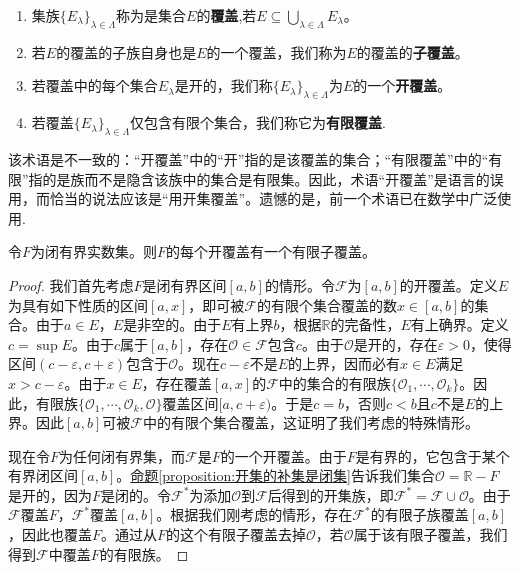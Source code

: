 \documentclass[lang=cn,newtx,10pt,scheme=chinese]{elegantbook}
\begin{document}
\begin{definition}[覆盖]\label{definition:覆盖}
\begin{enumerate}
  \item 集族\(\{E_{\lambda}\}_{\lambda\in\Lambda}\)称为是集合\(E\)的\textbf{覆盖},若\(E\subseteq\bigcup_{\lambda\in\Lambda}E_{\lambda}\)。
  
  \item 若\(E\)的覆盖的子族自身也是\(E\)的一个覆盖，我们称为\(E\)的覆盖的\textbf{子覆盖}。
  
  \item 若覆盖中的每个集合\(E_{\lambda}\)是开的，我们称\(\{E_{\lambda}\}_{\lambda\in\Lambda}\)为\(E\)的一个\textbf{开覆盖}。
  
  \item 若覆盖\(\{E_{\lambda}\}_{\lambda\in\Lambda}\)仅包含有限个集合，我们称它为\textbf{有限覆盖}.
\end{enumerate} 
\end{definition}
\begin{note}
  该术语是不一致的：“开覆盖”中的“开”指的是该覆盖的集合；“有限覆盖”中的“有限”指的是族而不是隐含该族中的集合是有限集。因此，术语“开覆盖”是语言的误用，而恰当的说法应该是“用开集覆盖”。遗憾的是，前一个术语已在数学中广泛使用.
\end{note}

\begin{theorem}\label{theorem:Heine - Borel定理}
  令\(F\)为闭有界实数集。则\(F\)的每个开覆盖有一个有限子覆盖。
\end{theorem}
\begin{proof}
  我们首先考虑\(F\)是闭有界区间\([a, b]\)的情形。令\(\mathcal{F}\)为\([a, b]\)的开覆盖。定义\(E\)为具有如下性质的区间\([a, x]\)，即可被\(\mathcal{F}\)的有限个集合覆盖的数\(x\in[a, b]\)的集合。由于\(a\in E\)，\(E\)是非空的。由于\(E\)有上界\(b\)，根据\(\mathbb{R}\)的完备性，\(E\)有上确界。定义\(c = \sup E\)。由于\(c\)属于\([a, b]\)，存在\(\mathcal{O}\in\mathcal{F}\)包含\(c\)。由于\(\mathcal{O}\)是开的，存在\(\varepsilon>0\)，使得区间\((c - \varepsilon, c+\varepsilon)\)包含于\(\mathcal{O}\)。现在\(c - \varepsilon\)不是\(E\)的上界，因而必有\(x\in E\)满足\(x>c - \varepsilon\)。由于\(x\in E\)，存在覆盖\([a, x]\)的\(\mathcal{F}\)中的集合的有限族\(\{\mathcal{O}_1, \cdots, \mathcal{O}_k\}\)。因此，有限族\(\{\mathcal{O}_1, \cdots, \mathcal{O}_k, \mathcal{O}\}\)覆盖区间\([a, c+\varepsilon)\)。于是\(c = b\)，否则\(c < b\)且\(c\)不是\(E\)的上界。因此\([a, b]\)可被\(\mathcal{F}\)中的有限个集合覆盖，这证明了我们考虑的特殊情形。

现在令\(F\)为任何闭有界集，而\(\mathcal{F}\)是\(F\)的一个开覆盖。由于\(F\)是有界的，它包含于某个有界闭区间\([a, b]\)。\hyperref[proposition:开集的补集是闭集]{命题\ref{proposition:开集的补集是闭集}}告诉我们集合\(\mathcal{O}=\mathbb{R}- F\)是开的，因为\(F\)是闭的。令\(\mathcal{F}^*\)为添加\(\mathcal{O}\)到\(\mathcal{F}\)后得到的开集族，即\(\mathcal{F}^*=\mathcal{F}\cup\mathcal{O}\)。由于\(\mathcal{F}\)覆盖\(F\)，\(\mathcal{F}^*\)覆盖\([a, b]\)。根据我们刚考虑的情形，存在\(\mathcal{F}^*\)的有限子族覆盖\([a, b]\)，因此也覆盖\(F\)。通过从\(F\)的这个有限子覆盖去掉\(\mathcal{O}\)，若\(\mathcal{O}\)属于该有限子覆盖，我们得到\(\mathcal{F}\)中覆盖\(F\)的有限族。
\end{proof}
\end{document}
